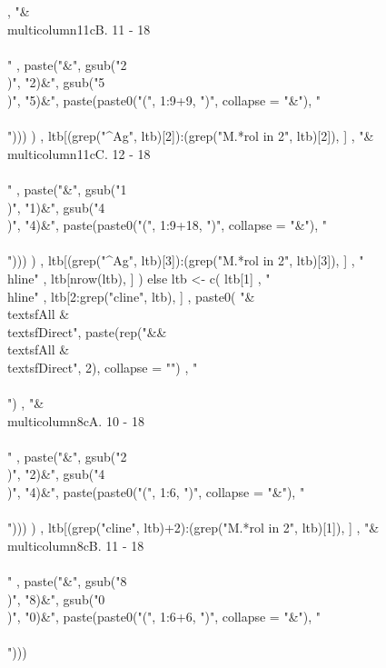 \begin{Schunk}
\begin{Sinput}
{      , 
      "&\\multicolumn{11}{c}{B. 11 - 18}\\\\"
      ,
      paste("&",
        gsub("2\\)", "2)&", gsub("5\\)", "5)&", paste(paste0("(", 1:9+9, ")", collapse = "&"), "\\\\")))
        )
      ,
      ltb[(grep("^Ag", ltb)[2]):(grep("M.*rol in 2", ltb)[2]), ]
      ,
      "&\\multicolumn{11}{c}{C. 12 - 18}\\\\"
      ,
      paste("&",
        gsub("1\\)", "1)&", gsub("4\\)", "4)&", paste(paste0("(", 1:9+18, ")", collapse = "&"), "\\\\")))
        )
      ,
      ltb[(grep("^Ag", ltb)[3]):(grep("M.*rol in 2", ltb)[3]), ]
      , 
      "\\hline"
      ,
        ltb[nrow(ltb), ]
      ) else
    ltb <- c(
      ltb[1]
      , 
      "\\hline"
      , 
      ltb[2:grep("cline", ltb), ]
      ,
      paste0(
        "&\\textsf{All} & \\textsf{Direct}",
        paste(rep("&&\\textsf{All} & \\textsf{Direct}", 2), collapse = "")
        , "\\\\")
      ,
      "&\\multicolumn{8}{c}{A. 10 - 18}\\\\"
      ,
      paste("&",
        gsub("2\\)", "2)&", gsub("4\\)", "4)&", paste(paste0("(", 1:6, ")", collapse = "&"), "\\\\")))
        )
      ,
      ltb[(grep("cline", ltb)+2):(grep("M.*rol in 2", ltb)[1]), ]
      , 
      "&\\multicolumn{8}{c}{B. 11 - 18}\\\\"
      ,
      paste("&",
        gsub("8\\)", "8)&", gsub("0\\)", "0)&", paste(paste0("(", 1:6+6, ")", collapse = "&"), "\\\\")))
}
\end{Sinput}
\end{Schunk}
